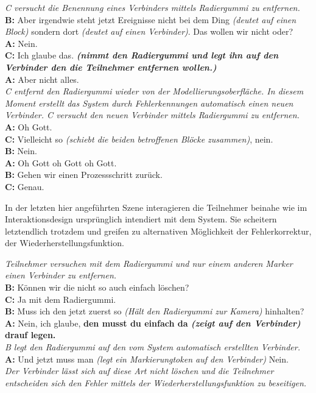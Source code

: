 \begin{transkript}
	\emph{C versucht die Benennung eines Verbinders mittels Radiergummi zu entfernen.}\\
	\textbf{B:} Aber irgendwie steht jetzt Ereignisse nicht bei dem Ding \emph{(deutet auf einen Block)} sondern dort \emph{(deutet auf einen Verbinder)}. Das wollen wir nicht oder?\\
	\textbf{A:} Nein.\\
	\textbf{C:} Ich glaube das. \emph{\textbf{(nimmt den Radiergummi und legt ihn auf den Verbinder den die Teilnehmer entfernen wollen.)}}\\
	\textbf{A:} Aber nicht alles.\\
	\emph{C entfernt den Radiergummi wieder von der Modellierungsoberfläche. In diesem Moment erstellt das System durch Fehlerkennungen automatisch einen neuen Verbinder. C versucht den neuen Verbinder mittels Radiergummi zu entfernen.}\\
	\textbf{A:} Oh Gott.\\
	\textbf{C:} Vielleicht so \emph{(schiebt die beiden betroffenen Blöcke zusammen)}, nein.\\
	\textbf{B:} Nein.\\
	\textbf{A:} Oh Gott oh Gott oh Gott.\\
	\textbf{B:} Gehen wir einen Prozessschritt zurück.\\
	\textbf{C:} Genau.\\
\end{transkript}

In der letzten hier angeführten Szene interagieren die Teilnehmer beinahe wie im Interaktionsdesign ursprünglich intendiert mit dem System. Sie scheitern letztendlich trotzdem und greifen zu alternativen Möglichkeit der Fehlerkorrektur, der Wiederherstellungsfunktion.

\begin{transkript}
	\emph{Teilnehmer versuchen mit dem Radiergummi und nur einem anderen Marker einen Verbinder zu entfernen.}\\
	\textbf{B:} Können wir die nicht so auch einfach löschen?\\
	\textbf{C:} Ja mit dem Radiergummi.\\
	\textbf{B:} Muss ich den jetzt zuerst so \emph{(Hält den Radiergummi zur Kamera)} hinhalten?\\
	\textbf{A:} Nein, ich glaube, \textbf{den musst du einfach da \emph{(zeigt auf den Verbinder)} drauf legen.}\\
	\emph{B legt den Radiergummi auf den vom System automatisch erstellten Verbinder.}\\
	\textbf{A:} Und jetzt muss man \emph{(legt ein Markierungtoken auf den Verbinder)} Nein.\\
	\emph{Der Verbinder lässt sich auf diese Art nicht löschen und die Teilnehmer entscheiden sich den Fehler mittels der Wiederherstellungsfunktion zu beseitigen.}
\end{transkript}

